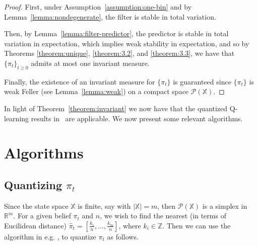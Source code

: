 \documentclass{article}
\begin{document}
\begin{proof}
    First, under Assumption~\ref{assumption:one-bin} and by Lemma~\ref{lemma:nondegenerate}, the filter is stable in total variation.

    Then, by Lemma~\ref{lemma:filter-predictor}, the predictor is stable in total variation in expectation, which implies weak stability in expectation, and so by Theorems \ref{theorem:unique}, \ref{theorem:3.2}, and \ref{theorem:3.3}, we have that \( \{\pi_t\}_{t\ge0} \) admits at most one invariant measure.

    Finally, the existence of an invariant measure for \( \{\pi_t\} \) is guaranteed since \( \{\pi_t\} \) is weak Feller (see Lemma~\ref{lemma:weak}) on a compact space \( \mathcal{P}(\mathbb{X}) \).
\end{proof}

In light of Theorem~\ref{theorem:invariant} we now have that the quantized Q-learning results in~\cite{Kara} are applicable. We now present some relevant algorithms.
\newpage
\section{Algorithms}\label{section:Algorithms}

\subsection{Quantizing \( \pi_t \)}\label{algorithm1}
Since the state space \( \mathbb{X} \) is finite, say with \( |\mathbb{X}| = m \), then \( \mathcal{P}(\mathbb{X}) \) is a simplex in \( \mathbb{R}^m \). For a given belief \( \pi_t \) and \( n \), we wish to find the nearest (in terms of Eucilidean distance) \( \hat{\pi}_t = [\frac{k_1}{n}, \ldots, \frac{k_m}{n}] \), where \( k_i \in \mathbb{Z} \). Then we can use the algorithm in e.g. \cite{Reznik}, \cite{Saldi} to quantize \(\pi_t\) as follows. %

\newcommand\showline{\stepcounter{linenum}\thelinenum}
\end{document}
